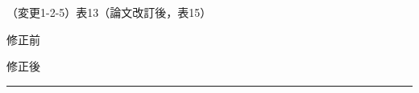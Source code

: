 \documentclass{jarticle} %
\def\subsection#1{ \vspace{1pc} {\gt #1} }
\def\nextans{ \vspace{2pc} \hrule }
\begin{document}
\subsection{（変更1-2-5）表13（論文改訂後，表15）}
\vspace{-0.3cm}
\begin{description}
\item 修正前\\
\phantom{　}
\begin{table}[h]
  \caption{2番目または3番目にDevelopingの作品を制作したBtoDユーザ数，およびDevelopingを制作するまで（Developingに到達時の作品を含む）のCTパスの種類数}
  \label{tab:ct-users}
  \vspace{2mm}
  \centering
   \vspace{-2mm}
\end{table}

\vspace{-0.3cm}
\item 修正後\\
\phantom{　}
\renewcommand{\thetable}{\arabic{table}}
\setcounter{table}{14}
\begin{table}[h]
  \caption{2番目または3番目にDevelopingの作品を制作したBtoDユーザ数，およびDevelopingを制作するまで（Developingに到達時の作品を含む）のCTパスの種類数}
  \label{tab:ct-users}
  \vspace{2mm}
  \centering
   \vspace{-2mm}
\end{table}

\end{description}

\newpage
\nextans
\end{document}
